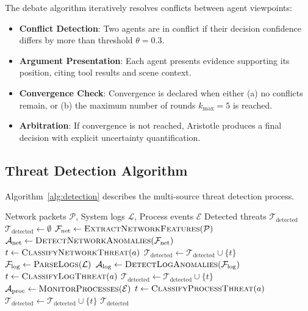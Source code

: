 The debate algorithm iteratively resolves conflicts between agent viewpoints:

\begin{itemize}
    \item \textbf{Conflict Detection}: Two agents are in conflict if their decision confidence differs by more than threshold $\theta = 0.3$.
    \item \textbf{Argument Presentation}: Each agent presents evidence supporting its position, citing tool results and scene context.
    \item \textbf{Convergence Check}: Convergence is declared when either (a) no conflicts remain, or (b) the maximum number of rounds $k_{\max} = 5$ is reached.
    \item \textbf{Arbitration}: If convergence is not reached, Aristotle produces a final decision with explicit uncertainty quantification.
\end{itemize}

\subsection{Threat Detection Algorithm}
\label{subsec:detection-algorithm}

Algorithm~\ref{alg:detection} describes the multi-source threat detection process.

\begin{algorithm}
\caption{Threat Detection Algorithm}
\label{alg:detection}
\begin{algorithmic}[1]
\Require Network packets $\mathcal{P}$, System logs $\mathcal{L}$, Process events $\mathcal{E}$
\Ensure Detected threats $\mathcal{T}_{\text{detected}}$
\State $\mathcal{T}_{\text{detected}} \leftarrow \emptyset$
\State $\mathcal{F}_{\text{net}} \leftarrow \textsc{ExtractNetworkFeatures}(\mathcal{P})$
\State $\mathcal{A}_{\text{net}} \leftarrow \textsc{DetectNetworkAnomalies}(\mathcal{F}_{\text{net}})$
    \State $t \leftarrow \textsc{ClassifyNetworkThreat}(a)$
    \State $\mathcal{T}_{\text{detected}} \leftarrow \mathcal{T}_{\text{detected}} \cup \{t\}$
\EndFor
\State $\mathcal{F}_{\text{log}} \leftarrow \textsc{ParseLogs}(\mathcal{L})$
\State $\mathcal{A}_{\text{log}} \leftarrow \textsc{DetectLogAnomalies}(\mathcal{F}_{\text{log}})$
    \State $t \leftarrow \textsc{ClassifyLogThreat}(a)$
    \State $\mathcal{T}_{\text{detected}} \leftarrow \mathcal{T}_{\text{detected}} \cup \{t\}$
\EndFor
\State $\mathcal{A}_{\text{proc}} \leftarrow \textsc{MonitorProcesses}(\mathcal{E})$
    \State $t \leftarrow \textsc{ClassifyProcessThreat}(a)$
    \State $\mathcal{T}_{\text{detected}} \leftarrow \mathcal{T}_{\text{detected}} \cup \{t\}$
\EndFor
\State \Return $\mathcal{T}_{\text{detected}}$
\end{algorithmic}
\end{algorithm}


